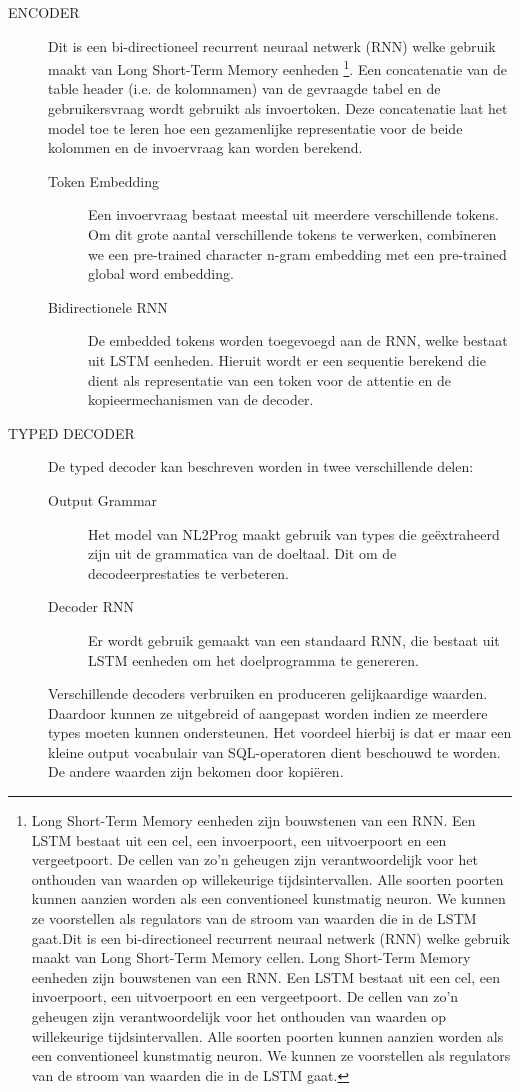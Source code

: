 \begin{description}
	\item[ENCODER] Dit is een bi-directioneel recurrent neuraal netwerk (RNN) welke gebruik maakt van Long Short-Term Memory eenheden \footnote{Long Short-Term Memory eenheden zijn bouwstenen van een RNN. Een LSTM bestaat uit een cel, een invoerpoort, een uitvoerpoort en een vergeetpoort. De cellen van zo’n geheugen zijn verantwoordelijk voor het onthouden van waarden op willekeurige tijdsintervallen. Alle soorten poorten kunnen aanzien worden als een conventioneel kunstmatig neuron. We kunnen ze voorstellen als regulators van de stroom van waarden die in de LSTM gaat.Dit is een bi-directioneel recurrent neuraal netwerk (RNN) welke gebruik maakt van Long Short-Term Memory cellen. Long Short-Term Memory eenheden zijn bouwstenen van een RNN. Een LSTM bestaat uit een cel, een invoerpoort, een uitvoerpoort en een vergeetpoort. De cellen van zo’n geheugen zijn verantwoordelijk voor het onthouden van waarden op willekeurige tijdsintervallen. Alle soorten poorten kunnen aanzien worden als een conventioneel kunstmatig neuron. We kunnen ze voorstellen als regulators van de stroom van waarden die in de LSTM gaat.}. Een concatenatie van de table header (i.e. de kolomnamen) van de gevraagde tabel en de gebruikersvraag wordt gebruikt als invoertoken. Deze concatenatie laat het model toe te leren hoe een gezamenlijke representatie voor de beide kolommen en de invoervraag kan worden berekend.
	\begin{description}
		\item[Token Embedding] Een invoervraag bestaat meestal uit meerdere verschillende tokens. Om dit grote aantal verschillende tokens te verwerken, combineren we een pre-trained character n-gram embedding met een pre-trained global word embedding. 
		\item[Bidirectionele RNN] De embedded tokens worden toegevoegd aan de RNN, welke bestaat uit LSTM eenheden. Hieruit wordt er een sequentie berekend die dient als representatie van een token voor de attentie en de kopieermechanismen van de decoder.
	\end{description}
	\item[TYPED DECODER] De typed decoder kan beschreven worden in twee verschillende delen:
	\begin{description}
		\item[Output Grammar] Het model van NL2Prog maakt gebruik van types die geëxtraheerd zijn uit de grammatica van de doeltaal. Dit om de decodeerprestaties te verbeteren.
		\item[Decoder RNN] Er wordt gebruik gemaakt van een standaard RNN, die bestaat uit LSTM eenheden om het doelprogramma te genereren. 
	\end{description}
	Verschillende decoders verbruiken en produceren gelijkaardige waarden. Daardoor kunnen ze uitgebreid of aangepast worden indien ze meerdere types moeten kunnen ondersteunen. Het voordeel hierbij is dat er maar een kleine output vocabulair van SQL-operatoren dient beschouwd te worden. De andere waarden zijn bekomen door kopiëren.
\end{description}

